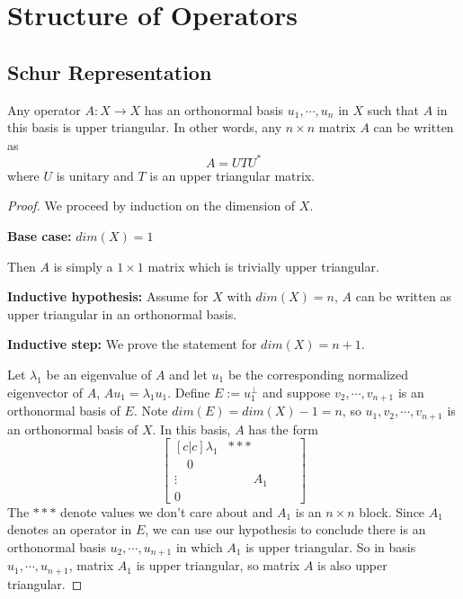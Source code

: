 \chapter{Structure of Operators}

\section{Schur Representation} 

\begin{theorem}
Any operator $A: X \rightarrow X$ has an orthonormal basis $u_{1}, \cdots, u_{n}$ in $X$ such that $A$ in this basis is upper triangular. In other words, any $n \times n$ matrix $A$ can be written as 
$$A = UTU^{*}$$
where $U$ is unitary and $T$ is an upper triangular matrix. 
\end{theorem}

\begin{proof}
We proceed by induction on the dimension of $X$. 

\textbf{Base case:} $dim(X) = 1$

Then $A$ is simply a $1 \times 1$ matrix which is trivially upper triangular. 

\textbf{Inductive hypothesis:} Assume for $X$ with $dim(X) = n$, $A$ can be written as upper triangular in an orthonormal basis. 

\textbf{Inductive step:} We prove the statement for $dim(X) = n + 1$. 

Let $\lambda_{1}$ be an eigenvalue of $A$ and let $u_{1}$ be the corresponding normalized eigenvector of $A$, $Au_{1} = \lambda_{1} u_{1}$. Define $E := u_{1}^{\perp}$ and suppose $v_{2}, \cdots, v_{n + 1}$ is an orthonormal basis of $E$. Note $dim(E) = dim(X) - 1 = n$, so $u_{1}, v_{2}, \cdots, v_{n + 1}$ is an orthonormal basis of $X$. In this basis, $A$ has the form 
$$\begin{bmatrix}[c|c]
\lambda_{1} & *** \\
\hline 
\quad 0 \quad &  \\
\vdots & \qquad A_{1} \qquad \\
0 & 
\end{bmatrix}
$$
The $***$ denote values we don't care about and $A_{1}$ is an $n \times n$ block. Since $A_{1}$ denotes an operator in $E$, we can use our hypothesis to conclude there is an orthonormal basis $u_{2}, \cdots, u_{n + 1}$ in which $A_{1}$ is upper triangular. So in basis $u_{1}, \cdots, u_{n + 1}$, matrix $A_{1}$ is upper triangular, so matrix $A$ is also upper triangular.
\end{proof}

